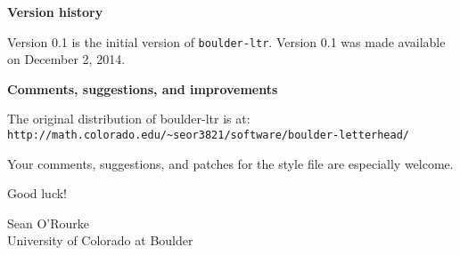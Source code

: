 \documentclass{letter}
\begin{document}
\begin{letter}
{\bf Version history}

Version 0.1 is the initial version of {\verb+boulder-ltr+}.  Version 0.1 was made available on December 2, 2014.  

{\bf Comments, suggestions, and improvements}

The original distribution of boulder-ltr is at:\\
{\verb+http://math.colorado.edu/~seor3821/software/boulder-letterhead/+} 

Your comments, suggestions, and patches for the style file are especially welcome. 


\bigskip

Good luck!


Sean O'Rourke \\
University of Colorado at Boulder 


\end{letter}
\end{document}

